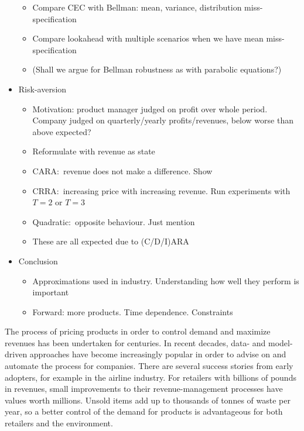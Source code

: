 \documentclass[main.tex]{subfiles}
\begin{document}
\begin{itemize}
\begin{itemize}
  \item Compare CEC with Bellman: mean, variance, distribution
    miss-specification
  \item Compare lookahead with multiple scenarios when we have mean miss-specification
  \item (Shall we argue for Bellman robustness as with parabolic equations?)
  \end{itemize}
\item Risk-aversion
  \begin{itemize}
  \item Motivation: product manager judged on profit over whole
    period. Company judged on quarterly/yearly profits/revenues, below worse
    than above expected?
  \item Reformulate with revenue as state
  \item CARA:~revenue does not make a difference. Show
  \item CRRA:~increasing price with increasing revenue. Run
    experiments with $T=2$ or $T=3$
  \item Quadratic:~opposite behaviour. Just mention
  \item These are all expected due to (C/D/I)ARA
  \end{itemize}
\item Conclusion
  \begin{itemize}
  \item Approximations used in industry. Understanding how well they
    perform is important
  \item Forward: more products. Time dependence. Constraints
  \end{itemize}
\end{itemize}

The process of pricing products in order to control demand and
maximize revenues has been undertaken for centuries. In recent
decades, data- and model-driven approaches have become increasingly
popular in order to advise on and automate the process for companies.
There are several success stories from early adopters, for example in
the airline industry.
For retailers with billions of pounds in revenues, small
improvements to their revenue-management processes have values worth millions.
Unsold items add up to thousands of tonnes of waste per year, so
a better control of the demand for products is advantageous
for both retailers and the environment.
\end{document}
